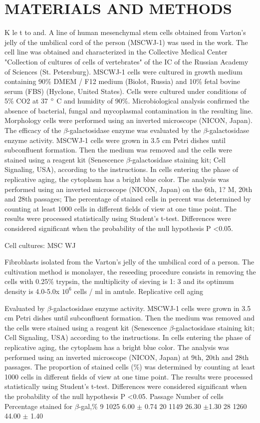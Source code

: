 \documentclass[a4paper,12pt]{article}
\begin{document}
\section{MATERIALS AND METHODS}

K le t to and. A line of human mesenchymal stem cells obtained from Varton's jelly of the umbilical cord of the person (MSCWJ-1) was used in the work. The cell line was obtained and characterized in the Collective Medical Center "Collection of cultures of cells of vertebrates" of the IC of the Russian Academy of Sciences (St. Petersburg). MSCWJ-1 cells were cultured in growth medium containing 90\% DMEM / F12 medium (Biolot, Russia) and 10\% fetal bovine serum (FBS) (Hyclone, United States). Cells were cultured under conditions of 5\% CO2 at 37 $\degree$ C and humidity of 90\%. Microbiological analysis confirmed the absence of bacterial, fungal and mycoplasmal contamination in the resulting line.
 Morphology cells were performed using an inverted microscope (NICON, Japan).
The efficacy of the $\beta$-galactosidase enzyme was evaluated by the $\beta$-galactosidase enzyme activity. MSCWJ-1 cells were grown in 3.5 cm Petri dishes until subconfluent formation. Then the medium was removed and the cells were stained using a reagent kit (Senescence $\beta$-galactosidase staining kit; Cell Signaling, USA), according to the instructions. In cells entering the phase of replicative aging, the cytoplasm has a bright blue color. The analysis was performed using an inverted microscope (NICON, Japan) on the 6th, 1? M, 20th and 28th passages; The percentage of stained cells in percent was determined by counting at least 1000 cells in different fields of view at one time point. The results were processed statistically using Student's t-test. Differences were considered significant when the probability of the null hypothesis P <0.05.

Cell cultures: MSC WJ

Fibroblasts isolated from the Varton's jelly of the umbilical cord of a person.
The cultivation method is monolayer, the reseeding procedure consists in removing the cells with 0.25\% trypsin, the multiplicity of sieving is 1: 3 and its optimum density is 4.0-5.0x $10 ^ 6$ cells / ml in amtule.
Replicative cell aging

Evaluated by $\beta$-galactosidase enzyme activity. MSCWJ-1 cells were grown in 3.5 cm Petri dishes until subconfluent formation.
Then the medium was removed and the cells were stained using a reagent kit (Senescence $\beta$-galactosidase staining kit; Cell Signaling, USA) according to the instructions. In cells entering the phase of replicative aging, the cytoplasm has a bright blue color. The analysis was performed using an inverted microscope (NICON, Japan) at 9th, 20th and 28th passages. The proportion of stained cells (\%) was determined by counting at least 1000 cells in different fields of view at one time point. The results were processed statistically using Student's t-test. Differences were considered significant when the probability of the null hypothesis P <0.05.
Passage Number of cells Percentage stained for $\beta$-gal,\%
9 1025 6.00 $\pm$ 0.74
20 1149 26.30 $\pm$1.30
28 1260 44.00 $\pm$ 1.40
\end{document}
